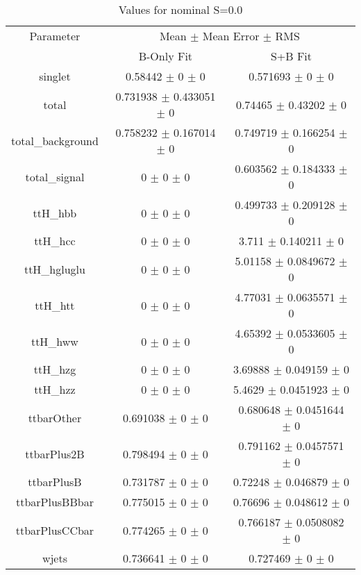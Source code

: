 \begin{table}
\centering
\caption{Values for nominal S=0.0}
\begin{tabular}{ccc}
\toprule
Parameter & \multicolumn{2}{c}{Mean $\pm$ Mean Error $\pm$ RMS}\\
 & B-Only Fit & S+B Fit\\
\midrule
singlet & \num{0.58442} $\pm$ \num{0} $\pm$ \num{0} & \num{0.571693} $\pm$ \num{0} $\pm$ \num{0}\\
total & \num{0.731938} $\pm$ \num{0.433051} $\pm$ \num{0} & \num{0.74465} $\pm$ \num{0.43202} $\pm$ \num{0}\\
total\_background & \num{0.758232} $\pm$ \num{0.167014} $\pm$ \num{0} & \num{0.749719} $\pm$ \num{0.166254} $\pm$ \num{0}\\
total\_signal & \num{0} $\pm$ \num{0} $\pm$ \num{0} & \num{0.603562} $\pm$ \num{0.184333} $\pm$ \num{0}\\
ttH\_hbb & \num{0} $\pm$ \num{0} $\pm$ \num{0} & \num{0.499733} $\pm$ \num{0.209128} $\pm$ \num{0}\\
ttH\_hcc & \num{0} $\pm$ \num{0} $\pm$ \num{0} & \num{3.711} $\pm$ \num{0.140211} $\pm$ \num{0}\\
ttH\_hgluglu & \num{0} $\pm$ \num{0} $\pm$ \num{0} & \num{5.01158} $\pm$ \num{0.0849672} $\pm$ \num{0}\\
ttH\_htt & \num{0} $\pm$ \num{0} $\pm$ \num{0} & \num{4.77031} $\pm$ \num{0.0635571} $\pm$ \num{0}\\
ttH\_hww & \num{0} $\pm$ \num{0} $\pm$ \num{0} & \num{4.65392} $\pm$ \num{0.0533605} $\pm$ \num{0}\\
ttH\_hzg & \num{0} $\pm$ \num{0} $\pm$ \num{0} & \num{3.69888} $\pm$ \num{0.049159} $\pm$ \num{0}\\
ttH\_hzz & \num{0} $\pm$ \num{0} $\pm$ \num{0} & \num{5.4629} $\pm$ \num{0.0451923} $\pm$ \num{0}\\
ttbarOther & \num{0.691038} $\pm$ \num{0} $\pm$ \num{0} & \num{0.680648} $\pm$ \num{0.0451644} $\pm$ \num{0}\\
ttbarPlus2B & \num{0.798494} $\pm$ \num{0} $\pm$ \num{0} & \num{0.791162} $\pm$ \num{0.0457571} $\pm$ \num{0}\\
ttbarPlusB & \num{0.731787} $\pm$ \num{0} $\pm$ \num{0} & \num{0.72248} $\pm$ \num{0.046879} $\pm$ \num{0}\\
ttbarPlusBBbar & \num{0.775015} $\pm$ \num{0} $\pm$ \num{0} & \num{0.76696} $\pm$ \num{0.048612} $\pm$ \num{0}\\
ttbarPlusCCbar & \num{0.774265} $\pm$ \num{0} $\pm$ \num{0} & \num{0.766187} $\pm$ \num{0.0508082} $\pm$ \num{0}\\
wjets & \num{0.736641} $\pm$ \num{0} $\pm$ \num{0} & \num{0.727469} $\pm$ \num{0} $\pm$ \num{0}\\
\bottomrule
\end{tabular}
\end{table}